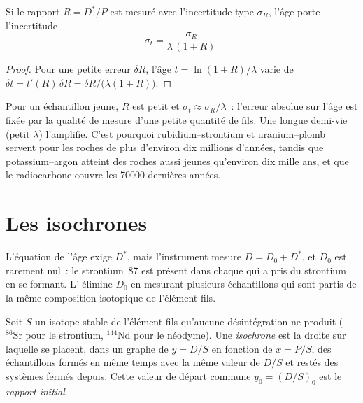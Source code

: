 \begin{proposition}\label{prop:b1:radiometric-methods:precision}
Si le rapport $R = D^*/P$ est mesuré avec l'incertitude-type $\sigma_R$,
l'âge porte l'incertitude
\[
  \sigma_t = \frac{\sigma_R}{\lambda\,(1 + R)}.
\]
\end{proposition}

\begin{proof}
Pour une petite erreur $\delta R$, l'âge $t = \ln(1+R)/\lambda$ varie de
$\delta t = t'(R)\,\delta R = \delta R/\bigl(\lambda(1 + R)\bigr)$.
\end{proof}

Pour un échantillon jeune, $R$ est petit et $\sigma_t \approx \sigma_R/\lambda$~: l'erreur
absolue sur l'âge est fixée par la qualité de mesure d'une petite quantité de fils. Une
longue demi-vie (petit $\lambda$) l'amplifie. C'est pourquoi
rubidium--strontium et uranium--plomb servent pour les roches de plus d'environ dix
millions d'années, tandis que potassium--argon atteint des roches aussi jeunes qu'environ dix
mille ans, et que le radiocarbone couvre les \num{70000} dernières années.

\section{Les isochrones}\label{sec:b1:radiometric-methods:isochrons}

L'équation de l'âge exige $D^*$, mais l'instrument mesure $D = D_0 + D^*$, et
$D_0$ est rarement nul~: le strontium~87 est présent dans chaque  qui a pris du
strontium en se formant. L' élimine $D_0$ en mesurant plusieurs
échantillons qui sont partis de la même composition isotopique de l'élément fils.

\begin{definition}\label{def:b1:radiometric-methods:isochron}
Soit $S$ un isotope stable de l'élément fils qu'aucune désintégration ne produit
($^{86}\mathrm{Sr}$ pour le strontium, $^{144}\mathrm{Nd}$ pour le néodyme). Une
\emph{isochrone} est la droite sur laquelle se placent, dans un graphe
de $y = D/S$ en fonction de $x = P/S$, des échantillons formés en même temps avec la
même valeur de $D/S$ et restés des systèmes fermés depuis. Cette valeur de départ commune
$y_0 = (D/S)_0$ est le \emph{rapport initial}.
\end{definition}

